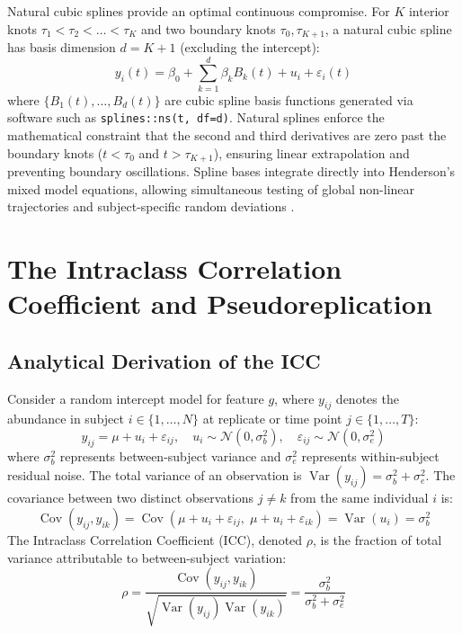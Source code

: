 \documentclass[11pt,twoside,openright]{book}
\begin{document}
Natural cubic splines provide an optimal continuous compromise. For $K$ interior knots $\tau_1 < \tau_2 < \dots < \tau_K$ and two boundary knots $\tau_0, \tau_{K+1}$, a natural cubic spline has basis dimension $d = K + 1$ (excluding the intercept):
\begin{equation}
\label{eq:spline_model}
y_i(t) = \beta_0 + \sum_{k=1}^d \beta_k B_k(t) + u_i + \varepsilon_i(t)
\end{equation}
where $\{B_1(t), \dots, B_d(t)\}$ are cubic spline basis functions generated via software such as \texttt{splines::ns(t, df=d)}. Natural splines enforce the mathematical constraint that the second and third derivatives are zero past the boundary knots ($t < \tau_0$ and $t > \tau_{K+1}$), ensuring linear extrapolation and preventing boundary oscillations. Spline bases integrate directly into Henderson's mixed model equations, allowing simultaneous testing of global non-linear trajectories and subject-specific random deviations \cite{hoffman2021dream}.

\section{The Intraclass Correlation Coefficient and Pseudoreplication}

\subsection{Analytical Derivation of the ICC}

Consider a random intercept model for feature $g$, where $y_{ij}$ denotes the abundance in subject $i \in \{1, \dots, N\}$ at replicate or time point $j \in \{1, \dots, T\}$:
\begin{equation}
\label{eq:random_intercept}
y_{ij} = \mu + u_i + \varepsilon_{ij}, \quad u_i \sim \mathcal{N}(0, \sigma_b^2), \quad \varepsilon_{ij} \sim \mathcal{N}(0, \sigma_e^2)
\end{equation}
where $\sigma_b^2$ represents between-subject variance and $\sigma_e^2$ represents within-subject residual noise. The total variance of an observation is $\operatorname{Var}(y_{ij}) = \sigma_b^2 + \sigma_e^2$. The covariance between two distinct observations $j \neq k$ from the same individual $i$ is:
\begin{equation}
\operatorname{Cov}(y_{ij}, y_{ik}) = \operatorname{Cov}(\mu + u_i + \varepsilon_{ij}, \; \mu + u_i + \varepsilon_{ik}) = \operatorname{Var}(u_i) = \sigma_b^2
\end{equation}
The Intraclass Correlation Coefficient (ICC), denoted $\rho$, is the fraction of total variance attributable to between-subject variation:
\begin{equation}
\label{eq:icc_formula}
\rho = \frac{\operatorname{Cov}(y_{ij}, y_{ik})}{\sqrt{\operatorname{Var}(y_{ij})\operatorname{Var}(y_{ik})}} = \frac{\sigma_b^2}{\sigma_b^2 + \sigma_e^2}
\end{equation}
\end{document}

